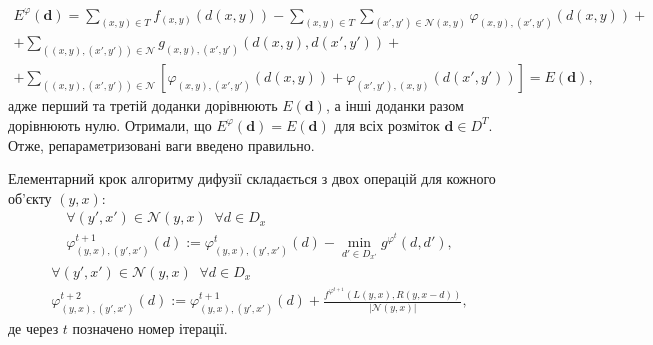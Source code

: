 \begin{equation*}
\begin{gathered}
    E^{\varphi} \left( \pmb{d} \right)
    = \sum \limits_{\left(x, y \right) \in T}
        f_{\left(x, y \right)} \left(d \left(x, y \right) \right)
    - \sum \limits_{\left(x, y \right) \in T}
        \sum \limits_{\left(x', y' \right) \in \mathcal{N} \left(x, y \right)}
            \varphi_{\left(x, y \right), \left(x', y' \right)} \left(
                d \left(x, y \right)
            \right) + \\
    + \sum \limits_{\left( \left(x, y \right), \left( x', y' \right) \right) \in \mathcal{N}}
        g_{\left(x, y \right), \left(x', y' \right)} \left(
            d \left(x, y \right), d \left(x', y' \right)
        \right) + \\
    + \sum \limits_{\left( \left(x, y \right), \left( x', y' \right) \right) \in \mathcal{N}}
        \left[
            \varphi_{\left(x, y \right), \left(x', y' \right)} \left(
                d \left(x, y \right)
            \right)
            + \varphi_{\left(x', y' \right), \left(x, y \right)} \left(
                d \left(x', y' \right)
            \right)
        \right] = E \left(\pmb{d} \right),
\end{gathered}
\end{equation*}
адже перший та третій доданки дорівнюють $E \left( \pmb{d} \right)$,
а інші доданки разом дорівнюють нулю.
Отримали, що
$E^{\varphi} \left(\pmb{d} \right)
    = E \left(\pmb{d} \right)$
для всіх розміток $\pmb{d} \in D^T$.
Отже, репараметризовані ваги введено правильно.

Елементарний крок алгоритму дифузії
складається з двох операцій для кожного об'єкту $\left(y, x \right)$:
\begin{equation}\label{eq:diffusion:first}
\begin{gathered}
    \forall \left( y', x' \right) \in \mathcal{N} \left(y,x\right) \; \;
    \forall d \in D_x \\
    \varphi_{\left(y, x \right), \left(y', x' \right)}^{t + 1} \left( d \right)
    := \varphi_{\left(y, x \right), \left(y', x' \right)}^t \left( d \right)
    - \min \limits_{d' \in D_{x'}}
        g^{\varphi^t} \left(d, d' \right),
\end{gathered}
\end{equation}
\begin{equation}\label{eq:diffusion:second}
\begin{gathered}
    \forall \left( y', x' \right) \in \mathcal{N} \left(y,x\right) \; \;
    \forall d \in D_x \\
    \varphi_{\left(y, x \right), \left(y', x' \right)}^{t + 2} \left( d \right)
    := \varphi_{\left(y, x \right), \left(y', x' \right)}^{t + 1} \left( d \right)
    + \frac{f^{\varphi^{t + 1}} \left(L \left(y, x\right) , R \left(y, x - d\right)\right)}{\left| \mathcal{N} \left(y, x \right)\right|},
\end{gathered}
\end{equation}
де через $t$ позначено номер ітерації.

